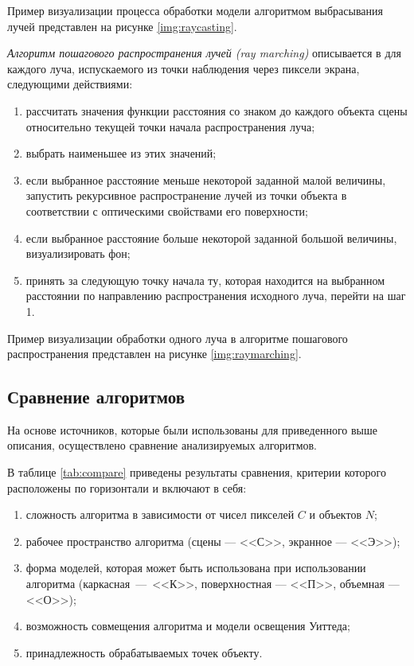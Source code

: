 Пример визуализации процесса обработки модели алгоритмом выбрасывания лучей представлен на рисунке \ref{img:raycasting}.


\textit{Алгоритм пошагового распространения лучей (ray marching)} описывается в \cite{bredenbals2022visualising} для каждого луча, испускаемого из точки наблюдения через пиксели экрана, следующими действиями:
\begin{enumerate}
	\item рассчитать значения функции расстояния со знаком до каждого объекта сцены относительно текущей точки начала распространения луча;
	\item выбрать наименьшее из этих значений;
	\item если выбранное расстояние меньше некоторой заданной малой величины, запустить рекурсивное распространение лучей из точки объекта в соответствии с оптическими свойствами его поверхности;
	\item если выбранное расстояние больше некоторой заданной большой величины, визуализировать фон;
	\item принять за следующую точку начала ту, которая находится на выбранном расстоянии по направлению распространения исходного луча, перейти на шаг 1.
\end{enumerate}

Пример визуализации обработки одного луча в алгоритме пошагового распространения представлен на рисунке \ref{img:raymarching}.


\subsection{Сравнение алгоритмов}

На основе источников, которые были использованы для приведенного выше описания, осуществлено сравнение анализируемых алгоритмов.

В таблице \ref{tab:compare} приведены результаты сравнения, критерии которого расположены по горизонтали и включают в себя:
\begin{enumerate}
	\item сложность алгоритма в зависимости от чисел пикселей $C$ и объектов $N$;
	\item рабочее пространство алгоритма (сцены --- <<С>>, экранное --- <<Э>>);
	\item форма моделей, которая может быть использована при использовании алгоритма (каркасная~---~<<К>>, поверхностная --- <<П>>, объемная --- <<О>>);
	\item возможность совмещения алгоритма и модели освещения Уиттеда;
	\item принадлежность обрабатываемых точек объекту.
\end{enumerate}

